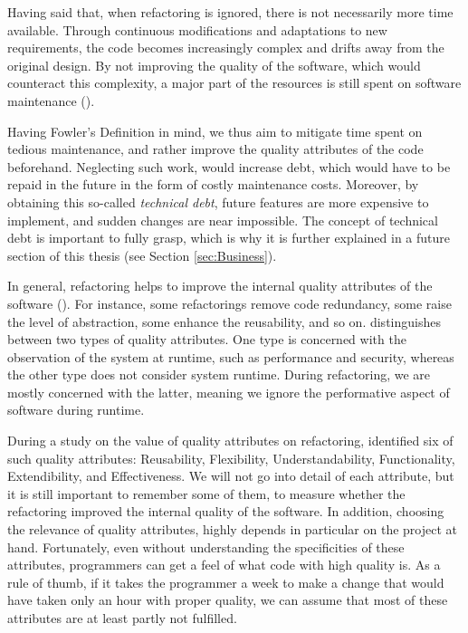 Having said that, when refactoring is ignored, there is not necessarily more time available.
Through continuous modifications and adaptations to new requirements, 
	the code becomes increasingly complex and drifts away from the original design.
By not improving the quality of the software, which would counteract this complexity, 
	a major part of the resources is still spent on software maintenance (\cite[p.~1]{mens2003}). 

Having Fowler's Definition in mind, 
	we thus aim to mitigate time spent on tedious maintenance, 
	and rather improve the quality attributes of the code beforehand.
Neglecting such work, would increase debt, 
	which would have to be repaid in the future in the form of costly maintenance costs.
Moreover, by obtaining this so-called \emph{technical debt}, 
	future features are more expensive to implement, and sudden changes are near impossible. 
The concept of technical debt is important to fully grasp, 
	which is why it is further explained in a future section of this thesis
(see Section \ref{sec:Business}).


In general, refactoring helps to improve the internal quality attributes of the software (\cite[p.~129]{mens2004}). 
For instance, some refactorings remove code redundancy, 
	some raise the level of abstraction, 
	some enhance the reusability, and so on.
\textcite{bass1998} distinguishes
	between two types of quality attributes. 
One type is concerned with the observation of the system at runtime, 
	such as performance and security, 
	whereas the other type does not consider  system runtime.
During refactoring, we are mostly concerned with the latter, 
	meaning we ignore the performative aspect of software during runtime.

During a study on the value of quality attributes on refactoring, 
	\textcite[p.~4]{alkhazi2020} identified 
	six of such quality attributes: 
	Reusability, Flexibility, Understandability, 
	Functionality, Extendibility, and Effectiveness.
We will not go into detail of each attribute, 
	but it is still important to remember some of them,
   to measure whether the refactoring improved the internal quality of the software.
In addition, choosing the relevance of quality attributes,
	highly depends in particular on the project at hand.
Fortunately, even without understanding the specificities of these attributes,
	programmers can get a feel of what code with high quality is.
As a rule of thumb, 
	if it takes the programmer a week to make a change 
	that would have taken only an hour with proper quality, 
	we can assume that most of these attributes are at 
	least partly not fulfilled.

